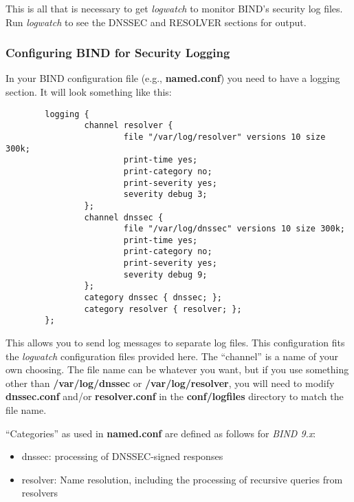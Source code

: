 \documentclass[12pt]{article}
\newcommand{\cmd}[1]{{\em #1}}
\newcommand{\path}[1]{{\bf #1}}
\begin{document}
This is all that is necessary to get \cmd{logwatch} to monitor BIND's
security log files.  Run \cmd{logwatch} to see the DNSSEC and RESOLVER
sections for output.


\subsubsection{Configuring BIND for Security Logging}

In your BIND configuration file (e.g., \path{named.conf})
you need to have a logging section.  It will look something like this:

\begin{verbatim}
        logging {
                channel resolver {
                        file "/var/log/resolver" versions 10 size 300k;
                        print-time yes;
                        print-category no;
                        print-severity yes;
                        severity debug 3;
                };
                channel dnssec {
                        file "/var/log/dnssec" versions 10 size 300k;
                        print-time yes;
                        print-category no;
                        print-severity yes;
                        severity debug 9;
                };
                category dnssec { dnssec; };
                category resolver { resolver; };
        };
\end{verbatim}

This allows you to send log messages to separate log files. This configuration
fits the \cmd{logwatch} configuration files provided here.  The ``channel'' is
a name of your own choosing.  The file name can be whatever you want, but if
you use something other than \path{/var/log/dnssec} or
\path{/var/log/resolver}, you will need to modify \path{dnssec.conf} and/or
\path{resolver.conf} in the \path{conf/logfiles} directory to match the file
name.

``Categories'' as used in \path{named.conf} are defined as follows for
\cmd{BIND 9.x}:

\begin{itemize}
\item dnssec: processing of DNSSEC-signed responses

\item resolver: Name resolution, including the processing of recursive
queries from resolvers
\end{itemize}
\end{document}
